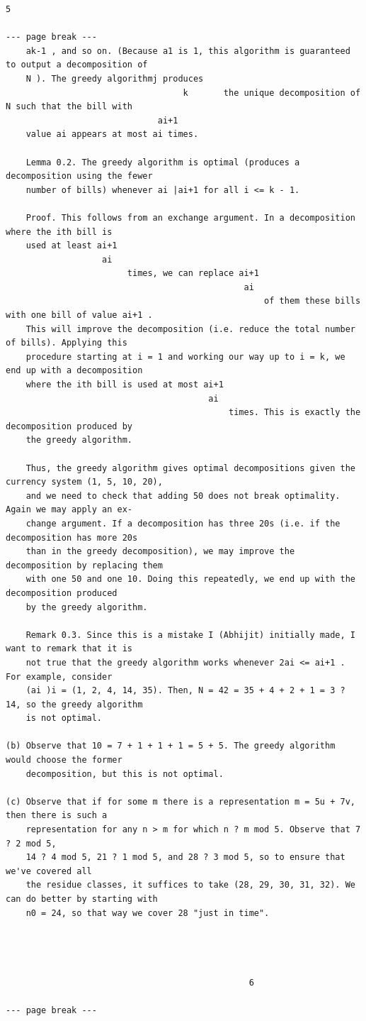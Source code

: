 \documentclass[12pt]{article}
\begin{document}
\begin{Verbatim}[breaklines=true,fontsize=\small]
                                                 5

--- page break ---
    ak-1 , and so on. (Because a1 is 1, this algorithm is guaranteed to output a decomposition of
    N ). The greedy algorithmj produces
                                   k       the unique decomposition of N such that the bill with
                              ai+1
    value ai appears at most ai times.

    Lemma 0.2. The greedy algorithm is optimal (produces a decomposition using the fewer
    number of bills) whenever ai |ai+1 for all i <= k - 1.

    Proof. This follows from an exchange argument. In a decomposition where the ith bill is
    used at least ai+1
                   ai
                        times, we can replace ai+1
                                               ai
                                                   of them these bills with one bill of value ai+1 .
    This will improve the decomposition (i.e. reduce the total number of bills). Applying this
    procedure starting at i = 1 and working our way up to i = k, we end up with a decomposition
    where the ith bill is used at most ai+1
                                        ai
                                            times. This is exactly the decomposition produced by
    the greedy algorithm.

    Thus, the greedy algorithm gives optimal decompositions given the currency system (1, 5, 10, 20),
    and we need to check that adding 50 does not break optimality. Again we may apply an ex-
    change argument. If a decomposition has three 20s (i.e. if the decomposition has more 20s
    than in the greedy decomposition), we may improve the decomposition by replacing them
    with one 50 and one 10. Doing this repeatedly, we end up with the decomposition produced
    by the greedy algorithm.

    Remark 0.3. Since this is a mistake I (Abhijit) initially made, I want to remark that it is
    not true that the greedy algorithm works whenever 2ai <= ai+1 . For example, consider
    (ai )i = (1, 2, 4, 14, 35). Then, N = 42 = 35 + 4 + 2 + 1 = 3 ? 14, so the greedy algorithm
    is not optimal.

(b) Observe that 10 = 7 + 1 + 1 + 1 = 5 + 5. The greedy algorithm would choose the former
    decomposition, but this is not optimal.

(c) Observe that if for some m there is a representation m = 5u + 7v, then there is such a
    representation for any n > m for which n ? m mod 5. Observe that 7 ? 2 mod 5,
    14 ? 4 mod 5, 21 ? 1 mod 5, and 28 ? 3 mod 5, so to ensure that we've covered all
    the residue classes, it suffices to take (28, 29, 30, 31, 32). We can do better by starting with
    n0 = 24, so that way we cover 28 "just in time".




                                                6

--- page break ---
\end{Verbatim}
\end{document}
